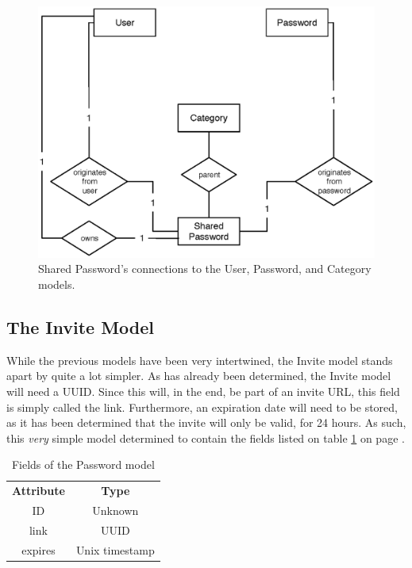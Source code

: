 			\begin{figure}[p]
				\centering
				\includegraphics[scale=0.75]{figures/design/uml/erd/user-category-password-sharedpassword.eps}
				\caption{Shared Password's connections to the User, Password, and Category models.}
				\label{fig:relationship:sharedpassword}
			\end{figure}

		\subsection{The Invite Model}
			While the previous models have been very intertwined, the Invite model stands apart by quite a lot simpler. As has already been determined, the Invite model will need a UUID. Since this will, in the end, be part of an invite URL, this field is simply called the link. Furthermore, an expiration date will need to be stored, as it has been determined that the invite will only be valid, for 24 hours. As such, this \emph{very} simple model determined to contain the fields listed on table \ref{fig:model:invite} on page \pageref{fig:model:invite}. 
			
			\begin{table}[p]
				\centering
				\begin{tabular}{c|c}
					\textbf{Attribute} 		& \textbf{Type} 		\\
					ID 						& Unknown 		\\
					link  					& UUID \\
					expires 				& Unix timestamp \\
				\end{tabular}
				\caption{Fields of the Password model}
				\label{fig:model:invite}
			\end{table}

